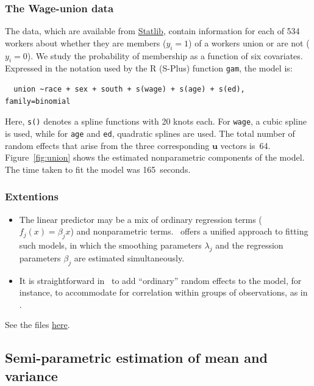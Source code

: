 \documentclass{admbmanual}
\newcommand{\citeasnoun}{\cite}
\begin{document}
\subsubsection{The Wage-union data}

The data, which are available from  \href{lib.stat.cmu.edu/}{Statlib},
contain information for each of 534 workers about whether they are members ($y_{i}=1$) 
of a workers union or are not ($y_{i}=0$). We study the probability of
membership as a function of six covariates. Expressed in the notation used
by the R (S-Plus) function \texttt{gam}, the model is:
\begin{verbatim}
  union ~race + sex + south + s(wage) + s(age) + s(ed), family=binomial
\end{verbatim}

Here, \texttt{s()} denotes a spline functions with 20 knots each. For 
\texttt{wage}, a cubic spline is used, while for \texttt{age} and \texttt{ed},
quadratic splines are used. The total number of random effects that arise
from the three corresponding $\mathbf{u}$ vectors is~64. Figure~\ref{fig:union} shows the estimated nonparametric components of the model. The
time taken to fit the model was 165~seconds.


\subsubsection{Extentions}

\begin{itemize}
\item The linear predictor may be a mix of ordinary regression terms ($f_{j}(x)=\beta _{j}x$) and nonparametric terms. \scAR\ offers a unified
approach to fitting such models, in which the smoothing parameters $\lambda
_{j}$ and the regression parameters $\beta _{j}$ are estimated
simultaneously.

\item It is straightforward in \scAR\ to add ``ordinary'' random effects to
the model, for instance, to accommodate for correlation within groups of
observations, as in \citeasnoun{lin:zhan:1999}.
\end{itemize}

See the files \href{http://otter-rsch.com/admbre/examples/union/union.html}{here}.


\subsection{Semi-parametric estimation of mean and variance}
\label{sec:lidar}
\end{document}
